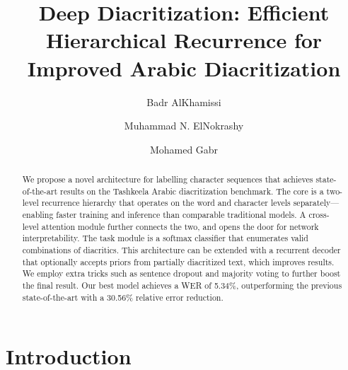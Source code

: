 \documentclass[11pt]{article}
\begin{document}
\title{Deep Diacritization: Efficient Hierarchical Recurrence for Improved Arabic Diacritization}


\author[1]{Badr AlKhamissi}
\author[1,2]{Muhammad N. ElNokrashy}
\author[2]{Mohamed Gabr}




\renewcommand\Affilfont{\fontsize{10}{10}\itshape}



\maketitle

\begin{abstract}
    We propose a novel architecture for labelling character sequences that achieves state-of-the-art results on the Tashkeela Arabic diacritization benchmark. The core is a two-level recurrence hierarchy that operates on the word and character levels separately---enabling faster training and inference than comparable traditional models. A cross-level attention module further connects the two, and opens the door for network interpretability. The task module is a softmax classifier that enumerates valid combinations of diacritics. This architecture can be extended with a recurrent decoder that optionally accepts priors from partially diacritized text, which improves results. We employ extra tricks such as sentence dropout and majority voting to further boost the final result. Our best model achieves a WER of 5.34\%, outperforming the previous state-of-the-art with a 30.56\% relative error reduction.
\end{abstract}

\section{Introduction}
\label{intro}

\end{document}
